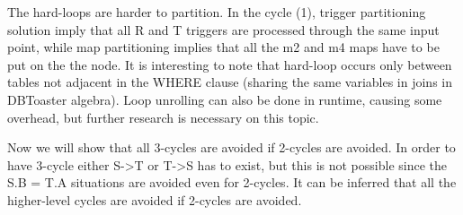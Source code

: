\documentclass{sig-semester}
\begin{document}
The hard-loops are harder to partition. In the cycle (1), trigger partitioning solution imply that all R and T triggers are processed through the same input point, while map partitioning implies that all the m2 and m4 maps have to be put on the the node. It is interesting to note that hard-loop occurs only between tables not adjacent in the WHERE clause (sharing the same variables in joins in DBToaster algebra). Loop unrolling can also be done in runtime, causing some overhead, but further research is necessary on this topic.

Now we will show that all 3-cycles are avoided if 2-cycles are avoided. In order to have 3-cycle either S->T or T->S has to exist, but this is not possible since the S.B = T.A situations are avoided even for 2-cycles. It can be inferred that all the higher-level cycles are avoided if 2-cycles are avoided.
\end{document}
